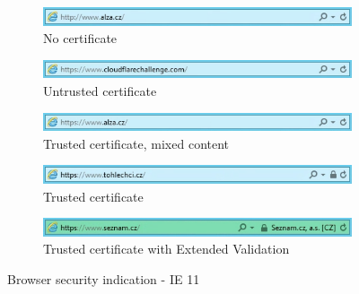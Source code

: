 \begin{figure}
  \begin{subfigure}[b]{\textwidth}
    \centering
    \includegraphics[scale=0.6]{images/browsers/ie-none.png}
    \caption{No certificate}
  \end{subfigure}
  \begin{subfigure}[b]{\textwidth}
    \centering
    \includegraphics[scale=0.6]{images/browsers/ie-untrusted.png}
    \caption{Untrusted certificate}
  \end{subfigure}
  \begin{subfigure}[b]{\textwidth}
    \centering
    \includegraphics[scale=0.6]{images/browsers/ie-mixed.png}
    \caption{Trusted certificate, mixed content}
  \end{subfigure}
  \begin{subfigure}[b]{\textwidth}
    \centering
    \includegraphics[scale=0.6]{images/browsers/ie-dv.png}
    \caption{Trusted certificate}
  \end{subfigure}
  \begin{subfigure}[b]{\textwidth}
    \centering
    \includegraphics[scale=0.6]{images/browsers/ie-ev.png}
    \caption{Trusted certificate with Extended Validation}
  \end{subfigure}
  \caption{Browser security indication - IE 11}
\end{figure}

